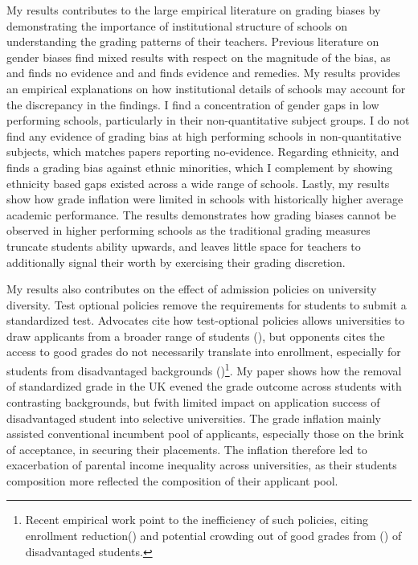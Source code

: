 My results contributes to the large empirical literature on grading biases by demonstrating the importance of institutional structure of schools on understanding the grading patterns of their teachers. Previous literature on gender biases find mixed results with respect on the magnitude of the bias, as \cite{hanna2012} and \cite{diamond} finds no evidence and \cite{lavy2018} and \cite{10.1093/qje/qjz008} finds evidence and remedies. My results provides an empirical explanations on how institutional details of schools may account for the discrepancy in the findings. I find a concentration of gender gaps in low performing schools, particularly in their non-quantitative subject groups. I do not find any evidence of grading bias at high performing schools in non-quantitative subjects, which matches papers reporting no-evidence. Regarding ethnicity, \cite{burgess2013} and \cite{Alesina2024}
finds a grading bias against ethnic minorities, which I complement by showing ethnicity based gaps existed across a wide range of schools. Lastly, my results show how grade inflation were limited in schools with historically higher average academic performance. The results demonstrates how grading biases cannot be observed in higher performing schools as the traditional grading measures truncate students ability upwards, and leaves little space for teachers to additionally signal their worth by exercising their grading discretion. 

My results also contributes on the effect of admission policies on university diversity. Test optional policies remove the requirements for students to submit a standardized test. Advocates cite how test-optional policies allows universities to draw applicants from a broader range of students (\cite{10.1257/aer.20231407}), but opponents cites the access to good grades do not necessarily translate into enrollment, especially for students from disadvantaged backgrounds (\cite{NBERw18586})\footnote{Recent empirical work point to the inefficiency of such policies, citing enrollment reduction(\cite{NBERw34260}) and potential crowding out of good grades from  (\cite{NBERw33389}) of disadvantaged students. }. My paper shows how the removal of standardized grade in the UK evened the grade outcome across students with contrasting backgrounds, but fwith limited impact on application success of disadvantaged student into selective universities. The grade inflation mainly assisted conventional incumbent pool of applicants, especially those on the brink of acceptance, in securing their placements. The inflation therefore led to exacerbation of parental income inequality across universities, as their students composition more reflected the composition of their applicant pool. 

